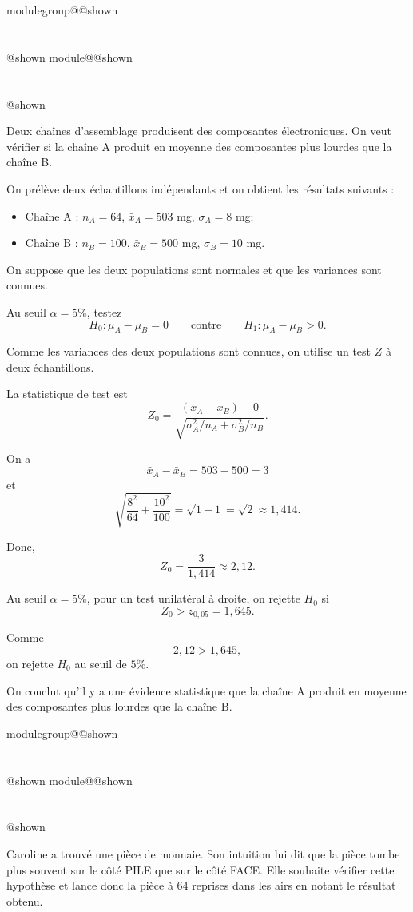 \documentclass{Evaluation}
\makeatletter
\newcommand{\currentmodulekey}{}
\newcommand{\currentmoduletitle}{}
\newcommand{\currentgroupkey}{}
\newcommand{\currentgrouptitle}{}
\newcommand{\showmoduleifneeded}{%
  \ifx\currentgroupkey\empty\else
    \expandafter\ifx\csname modulegroup@\currentgroupkey @shown\endcsname\relax
      \section*{\currentgrouptitle}%
      \expandafter\gdef\csname modulegroup@\currentgroupkey @shown\endcsname{1}%
    \fi
  \fi
  \expandafter\ifx\csname module@\currentmodulekey @shown\endcsname\relax
    \section*{\currentmoduletitle}%
    \expandafter\gdef\csname module@\currentmodulekey @shown\endcsname{1}%
  \fi
}
\newenvironment{H26r}{\showmoduleifneeded}{}
\makeatother
\begin{document}
\begin{questions}
\begin{H26r}
\question {} %
Deux chaînes d'assemblage produisent des composantes électroniques. On veut vérifier si la chaîne A produit en moyenne des composantes plus lourdes que la chaîne B.

On prélève deux échantillons indépendants et on obtient les résultats suivants :
\begin{itemize}
\item Chaîne A : \(n_A=64\), \(\bar x_A=503\) mg, \(\sigma_A=8\) mg;
\item Chaîne B : \(n_B=100\), \(\bar x_B=500\) mg, \(\sigma_B=10\) mg.
\end{itemize}

On suppose que les deux populations sont normales et que les variances sont connues.

Au seuil \(\alpha=5\%\), testez
\[
H_0:\mu_A-\mu_B=0
\qquad \text{contre} \qquad
H_1:\mu_A-\mu_B>0.
\]

\begin{solution}
Comme les variances des deux populations sont connues, on utilise un test \(Z\) à deux échantillons.

La statistique de test est
\[
Z_0=\frac{(\bar x_A-\bar x_B)-0}{\sqrt{\sigma_A^2/n_A+\sigma_B^2/n_B}}.
\]

On a
\[
\bar x_A-\bar x_B=503-500=3
\]
et
\[
\sqrt{\frac{8^2}{64}+\frac{10^2}{100}}
=\sqrt{1+1}
=\sqrt{2}
\approx 1{,}414.
\]

Donc,
\[
Z_0=\frac{3}{1{,}414}\approx 2{,}12.
\]

Au seuil \(\alpha=5\%\), pour un test unilatéral à droite, on rejette \(H_0\) si
\[
Z_0>z_{0{,}05}=1{,}645.
\]

Comme
\[
2{,}12>1{,}645,
\]
on rejette \(H_0\) au seuil de \(5\%\).

On conclut qu'il y a une évidence statistique que la chaîne A produit en moyenne des composantes plus lourdes que la chaîne B.
\end{solution}
\end{H26r}

\begin{H26r}
\question {} %

Caroline a trouvé une pièce de monnaie. Son intuition lui dit que la pièce tombe plus souvent sur le côté PILE que sur le côté FACE. Elle souhaite vérifier cette hypothèse et lance donc la pièce à \(64\) reprises dans les airs en notant le résultat obtenu.

\begin{parts}


\end{parts}
\end{H26r}
\end{questions}
\end{document}
